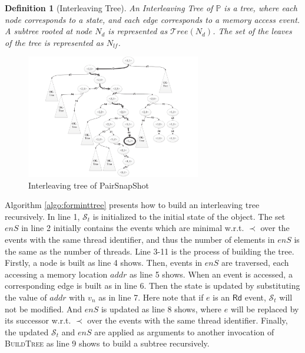 \documentclass[runningheads]{llncs}
\newcommand{\eread}{\mathsf{Rd}}
\newtheorem{myDef}{Definition}
\begin{document}
\begin{myDef}[Interleaving Tree]
    An \textit{Interleaving Tree} of $\mathbb{P}$ is a tree, where each node corresponds to a state, and each edge corresponds to a memory access event. A subtree rooted at node $N_d$ is represented as $\mathcal{T}ree(N_d)$. The set of the leaves of the tree is represented as $N_{lf}$.
\end{myDef}

\begin{figure}
\centering
\includegraphics[width = 3in]{pssinttree.pdf}
\caption{Interleaving tree of PairSnapShot}\label{fig:interleavingtreeofpairsnapshot}
\end{figure}

    Algorithm \ref{algo:forminttree} presents how to build an interleaving tree recursively. In line 1, $\mathcal{S}_t$ is initialized to the initial state of the object. The set $\mathit{enS}$ in line 2 initially contains the events which are minimal w.r.t. $\prec$ over the events with the same thread identifier, and thus the number of elements in $\mathit{enS}$ is the same as the number of threads. Line 3-11 is the process of building the tree. Firstly, a node is built as line 4 shows. Then, events in $\mathit{enS}$ are traversed, each accessing a memory location $addr$ as line 5 shows. When an event is accessed, a corresponding edge is built as in line 6. Then the state is updated by substituting the value of $addr$ with $v_n$ as in line 7. Here note that if $e$ is an $\eread$ event, $\mathcal{S}_t$ will not be modified. And $\mathit{enS}$ is updated as line 8 shows, where $e$ will be replaced by its successor w.r.t. $\prec$ over the events with the same thread identifier. Finally, the updated $\mathcal{S}_t$ and $\mathit{enS}$ are applied as arguments to another invocation of \textsc{BuildTree} as line 9 shows to build a subtree recursively.
\end{document}
